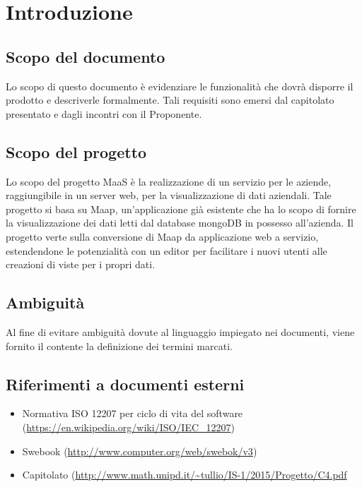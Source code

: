 \section{Introduzione}
\subsection{Scopo del documento}
Lo scopo di questo documento è evidenziare le funzionalit\`a che dovr\`a disporre il prodotto e descriverle formalmente. Tali requisiti sono emersi dal capitolato presentato e dagli incontri con il Proponente.

\subsection{Scopo del progetto}
Lo scopo del progetto MaaS è la realizzazione di un servizio per le aziende, raggiungibile in un server web, per la visualizzazione di dati aziendali. Tale progetto si basa su Maap, un'applicazione già esistente che ha lo scopo di fornire la visualizzazione dei dati letti dal database mongoDB in possesso all'azienda. Il progetto verte sulla conversione di Maap da applicazione web a servizio, estendendone le potenzialità con un editor per facilitare i nuovi utenti alle creazioni di viste per i propri dati.

\subsection{Ambiguit\`a}
Al fine di evitare ambiguità dovute al linguaggio impiegato nei documenti, viene fornito il \Glossario contente la definizione dei termini marcati.

\subsection{Riferimenti a documenti esterni}
\begin{itemize}
\item Normativa ISO 12207 per ciclo di vita del software (\url{https://en.wikipedia.org/wiki/ISO/IEC_12207})
\item Swebook (\url{http://www.computer.org/web/swebok/v3})
\item Capitolato (\url{http://www.math.unipd.it/~tullio/IS-1/2015/Progetto/C4.pdf}
  \end{itemize}

